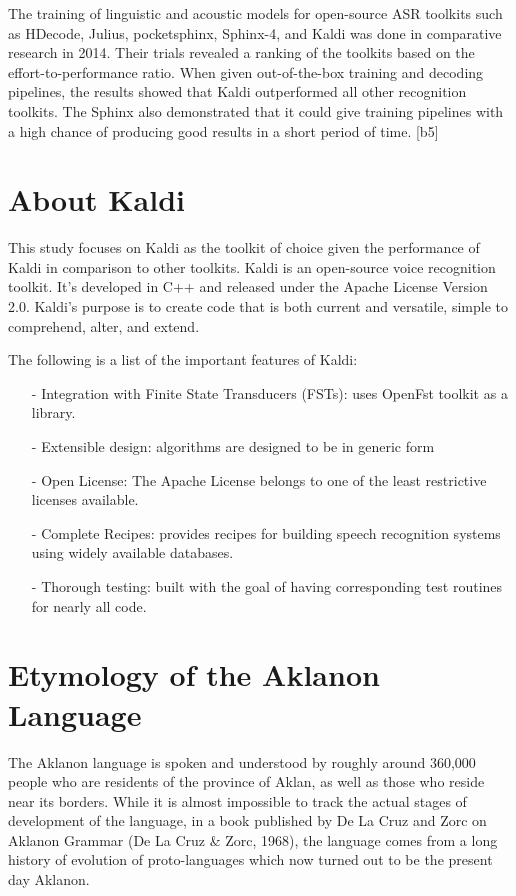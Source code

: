 The training of linguistic and acoustic models for open-source ASR toolkits such as HDecode, Julius, pocketsphinx, Sphinx-4, and Kaldi was done in comparative research in 2014. Their trials revealed a ranking of the toolkits based on the effort-to-performance ratio. When given out-of-the-box training and decoding pipelines, the results showed that Kaldi outperformed all other recognition toolkits. The Sphinx also demonstrated that it could give training pipelines with a high chance of producing good results in a short period of time. [b5]

\section{About Kaldi}


This study focuses on Kaldi as the toolkit of choice given the performance of Kaldi in comparison to other toolkits. Kaldi is an open-source voice recognition toolkit. It's developed in C++ and released under the Apache License Version 2.0. Kaldi's purpose is to create code that is both current and versatile, simple to comprehend, alter, and extend.

\noindent
The following is a list of the important features of Kaldi: 

\begin{itemize}
\item[-] Integration with Finite State Transducers (FSTs): uses OpenFst toolkit as a library.
\item[-] Extensible design: algorithms are designed to be in generic form
\item[-] Open License: The Apache License belongs to one of the least restrictive licenses available. 
\item[-] Complete Recipes: provides recipes for building speech recognition systems using widely available databases.
\item[-] Thorough testing: built with the goal of having corresponding test routines for nearly all code.

\end{itemize}


\section{Etymology of the Aklanon Language}

The Aklanon language is spoken and understood by roughly around 360,000 people who are residents of the province of Aklan, as well as those who reside near its borders. While it is almost impossible to track the actual stages of development of the language, in a book published by De La Cruz and Zorc on Aklanon Grammar (De La Cruz \& Zorc, 1968), the language comes from a long history of evolution of proto-languages which now turned out to be the present day Aklanon. 

